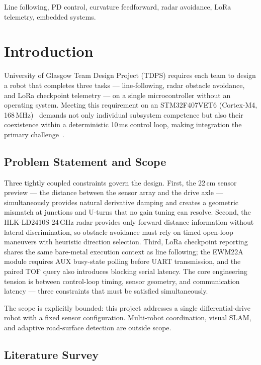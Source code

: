 \documentclass[letterpaper,journal]{IEEEtran}
\begin{document}
\begin{IEEEkeywords}
Line following, PD control, curvature feedforward, radar avoidance, LoRa telemetry, embedded systems.
\end{IEEEkeywords}

\section{Introduction}

 University of Glasgow Team Design Project (TDPS) requires each team to design a robot that completes three tasks --- line-following, radar obstacle avoidance, and LoRa checkpoint telemetry --- on a single microcontroller without an operating system. Meeting this requirement on an STM32F407VET6 (Cortex-M4, 168\,MHz)~\cite{cortex_m4_trm} demands not only individual subsystem competence but also their coexistence within a deterministic 10\,ms control loop, making integration the primary challenge~\cite{siegwart2011autonomous, astrom1995pid}.

\subsection{Problem Statement and Scope}

Three tightly coupled constraints govern the design. First, the 22\,cm sensor preview --- the distance between the sensor array and the drive axle --- simultaneously provides natural derivative damping and creates a geometric mismatch at junctions and U-turns that no gain tuning can resolve. Second, the HLK-LD2410S 24\,GHz radar provides only forward distance information without lateral discrimination, so obstacle avoidance must rely on timed open-loop maneuvers with heuristic direction selection. Third, LoRa checkpoint reporting shares the same bare-metal execution context as line following; the EWM22A module requires AUX busy-state polling before UART transmission, and the paired TOF query also introduces blocking serial latency. The core engineering tension is between control-loop timing, sensor geometry, and communication latency --- three constraints that must be satisfied simultaneously.

The scope is explicitly bounded: this project addresses a single differential-drive robot with a fixed sensor configuration. Multi-robot coordination, visual SLAM, and adaptive road-surface detection are outside scope.

\subsection{Literature Survey}
\end{document}
